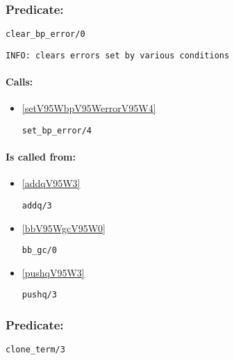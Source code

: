\subsubsection{Predicate:} \label{clearV95WbpV95WerrorV95W0}

\begin{verbatim}
clear_bp_error/0
\end{verbatim}

{\small \begin{verbatim}
INFO: clears errors set by various conditions

\end{verbatim}}
\paragraph{Calls:} 
\begin{itemize}
\item \ref{setV95WbpV95WerrorV95W4} 
\begin{verbatim}
set_bp_error/4
\end{verbatim}

\end{itemize}
\paragraph{Is called from:} 
\begin{itemize}
\item \ref{addqV95W3} 
\begin{verbatim}
addq/3
\end{verbatim}

\item \ref{bbV95WgcV95W0} 
\begin{verbatim}
bb_gc/0
\end{verbatim}

\item \ref{pushqV95W3} 
\begin{verbatim}
pushq/3
\end{verbatim}

\end{itemize}

\subsubsection{Predicate:} \label{cloneV95WtermV95W3}

\begin{verbatim}
clone_term/3
\end{verbatim}

